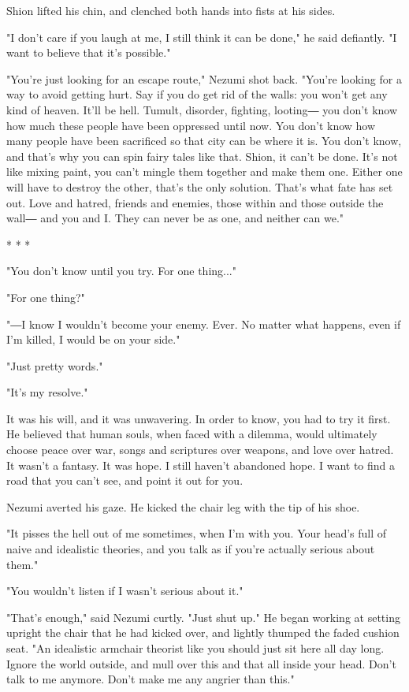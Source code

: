 Shion lifted his chin, and clenched both hands into fists at his sides.

"I don't care if you laugh at me, I still think it can be done," he said
defiantly. "I want to believe that it's possible."

"You're just looking for an escape route," Nezumi shot back. "You're
looking for a way to avoid getting hurt. Say if you do get rid of the
walls: you won't get any kind of heaven. It'll be hell. Tumult,
disorder, fighting, looting― you don't know how much these people have
been oppressed until now. You don't know how many people have been
sacrificed so that city can be where it is. You don't know, and that's
why you can spin fairy tales like that. Shion, it can't be done. It's
not like mixing paint, you can't mingle them together and make them one.
Either one will have to destroy the other, that's the only solution.
That's what fate has set out. Love and hatred, friends and enemies,
those within and those outside the wall― and you and I. They can never
be as one, and neither can we."

* * *

"You don't know until you try. For one thing..."

"For one thing?"

"―I know I wouldn't become your enemy. Ever. No matter what happens,
even if I'm killed, I would be on your side."

"Just pretty words."

"It's my resolve."

It was his will, and it was unwavering. In order to know, you had to try
it first. He believed that human souls, when faced with a dilemma, would
ultimately choose peace over war, songs and scriptures over weapons, and
love over hatred. It wasn't a fantasy. It was hope. I still haven't
abandoned hope. I want to find a road that you can't see, and point it
out for you.

Nezumi averted his gaze. He kicked the chair leg with the tip of his
shoe.

"It pisses the hell out of me sometimes, when I'm with you. Your head's
full of naive and idealistic theories, and you talk as if you're
actually serious about them."

"You wouldn't listen if I wasn't serious about it."

"That's enough," said Nezumi curtly. "Just shut up." He began working at
setting upright the chair that he had kicked over, and lightly thumped
the faded cushion seat. "An idealistic armchair theorist like you should
just sit here all day long. Ignore the world outside, and mull over this
and that all inside your head. Don't talk to me anymore. Don't make me
any angrier than this."

